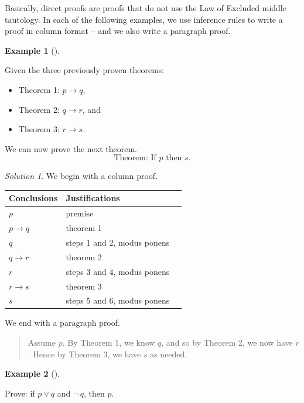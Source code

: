 \documentclass[
  letterpaper,
  10pt,
  reqno,
  twopage,
  openany]{book}
\providecommand{\tightlist}{%
  \setlength{\itemsep}{0pt}\setlength{\parskip}{0pt}}\usepackage{longtable,booktabs,array}
\theoremstyle{plain}
\theoremstyle{definition}
\theoremstyle{definition}
\theoremstyle{definition}
\newtheorem{example}{Example}[chapter]
\theoremstyle{plain}
\theoremstyle{plain}
\theoremstyle{remark}
\newtheorem*{solution}{Solution}
\begin{document}
Basically, direct proofs are proofs that do not use the Law of Excluded
middle tautology. In each of the following examples, we use inference
rules to write a proof in column format -- and we also write a paragraph
proof.

\leavevmode{}%
\begin{example}[]\label{exm-direct-proofs}

Given the three previously proven theorems:

\begin{itemize}
\tightlist
\item
  Theorem 1: \(p\rightarrow q\),
\item
  Theorem 2: \(q\rightarrow r\), and
\item
  Theorem 3: \(r\rightarrow s\).
\end{itemize}

We can now prove the next theorem. \[
\text{Theorem: If $p$ then $s$.}
\]

\end{example}

\begin{solution}

We begin with a column proof.

\begin{longtable}[]{@{}lll@{}}
\toprule()
Conclusions & Justifications & \\
\midrule()
\endhead
\(p\) & premise & \\
\(p\rightarrow q\) & theorem 1 & \\
\(q\) & steps 1 and 2, modus ponens & \\
\(q\rightarrow r\) & theorem 2 & \\
\(r\) & steps 3 and 4, modus ponens & \\
\(r\rightarrow s\) & theorem 3 & \\
\(s\) & steps 5 and 6, modus ponens & \\
\bottomrule()
\end{longtable}

We end with a paragraph proof.

\begin{quote}
Assume \(p\). By Theorem 1, we know \(q\), and so by Theorem 2, we now
have \(r\). Hence by Theorem 3, we have \(s\) as needed.
\end{quote}

\end{solution}

\leavevmode{}%
\begin{example}[]\label{exm-proof-example}

Prove: if \(p\lor q\) and \(\neg \, q\), then \(p\).

\end{example}
\end{document}
